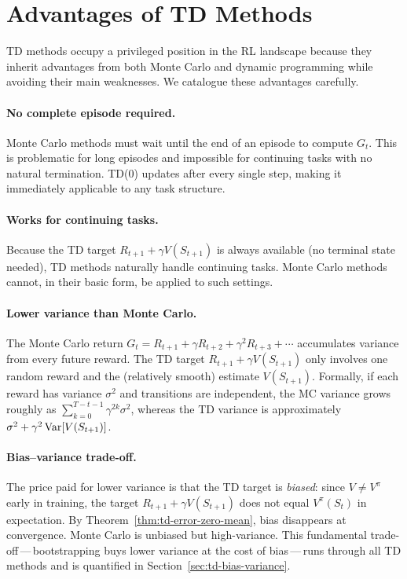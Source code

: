 \section{Advantages of TD Methods}
\label{sec:td-advantages}

TD methods occupy a privileged position in the RL landscape because they inherit advantages from both Monte Carlo and dynamic programming while avoiding their main weaknesses.  We catalogue these advantages carefully.

\paragraph{No complete episode required.}
Monte Carlo methods must wait until the end of an episode to compute $G_t$.  This is problematic for long episodes and impossible for continuing tasks with no natural termination.  TD(0) updates after every single step, making it immediately applicable to any task structure.

\paragraph{Works for continuing tasks.}
Because the TD target $R_{t+1}+\gamma V(S_{t+1})$ is always available (no terminal state needed), TD methods naturally handle continuing tasks.  Monte Carlo methods cannot, in their basic form, be applied to such settings.

\paragraph{Lower variance than Monte Carlo.}
The Monte Carlo return $G_t = R_{t+1} + \gamma R_{t+2} + \gamma^2 R_{t+3} + \cdots$ accumulates variance from every future reward.  The TD target $R_{t+1}+\gamma V(S_{t+1})$ only involves one random reward and the (relatively smooth) estimate $V(S_{t+1})$.  Formally, if each reward has variance $\sigma^2$ and transitions are independent, the MC variance grows roughly as $\sum_{k=0}^{T-t-1} \gamma^{2k}\sigma^2$, whereas the TD variance is approximately $\sigma^2 + \gamma^2 \operatorname{Var}[V(S_{t+1})]$.

\paragraph{Bias--variance trade-off.}
The price paid for lower variance is that the TD target is \emph{biased}: since $V \ne V^\pi$ early in training, the target $R_{t+1}+\gamma V(S_{t+1})$ does not equal $V^\pi(S_t)$ in expectation.  By Theorem~\ref{thm:td-error-zero-mean}, bias disappears at convergence.  Monte Carlo is unbiased but high-variance.  This fundamental trade-off\,---\,bootstrapping buys lower variance at the cost of bias\,---\,runs through all TD methods and is quantified in Section~\ref{sec:td-bias-variance}.

